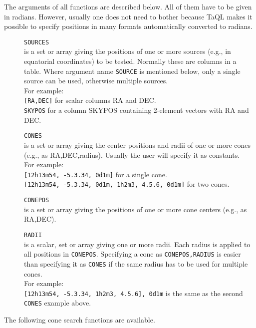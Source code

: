 The arguments of all functions are described below. All of them have
to be given in radians. However, usually one does not need to bother
because TaQL makes it possible
to specify positions in many formats automatically converted
to radians.
\begin{description}
  \item[] \texttt{SOURCES}\\
       is a set or array giving the positions of one or more
       sources (e.g., in equatorial coordinates)
       to be tested. Normally these are columns in a table.
       Where argument name \texttt{SOURCE} is mentioned below, only a
       single source can be used, otherwise multiple sources.
       \\For example:
       \\\texttt{[RA,DEC]} for scalar columns RA and DEC.
       \\\texttt{SKYPOS} for a column SKYPOS containing 2-element
       vectors with RA and DEC.
  \item[] \texttt{CONES}\\
       is a set or array giving the center positions and radii of
       one or more cones (e.g., as RA,DEC,radius).
       Usually the user will specify it as constants.
       \\For example:
       \\\texttt{[12h13m54, -5.3.34, 0d1m]} for a single cone.
       \\\texttt{[12h13m54, -5.3.34, 0d1m, 1h2m3, 4.5.6, 0d1m]} for two cones.
  \item[] \texttt{CONEPOS}\\
       is a set or array giving the positions of one or more
       cone centers (e.g., as RA,DEC).
  \item[] \texttt{RADII}\\
       is a scalar, set or array giving one or more radii.
       Each radius is applied to all positions in \texttt{CONEPOS}.
       Specifying a cone as \texttt{CONEPOS,RADIUS} is easier than specifying
       it as \texttt{CONES} if the same radius has to be used for
       multiple cones.
       \\For example:
       \\\texttt{[12h13m54, -5.3.34, 1h2m3, 4.5.6], 0d1m} is the same
       as the second \texttt{CONES} example above.
\end{description}
The following cone search functions are available.
